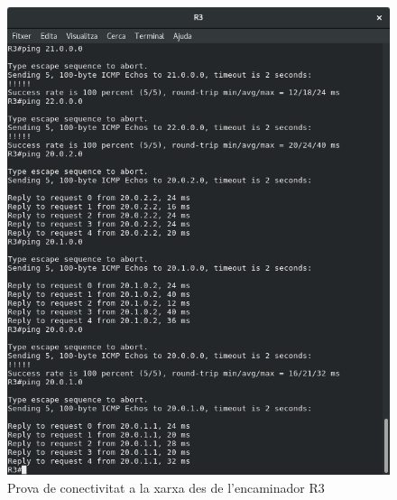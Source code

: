 \documentclass[10pt]{article}
\begin{document}
\begin{figure}[H]
\begin{center}
\includegraphics[scale=0.4]{Images/ospf-R3-conectivity.png}
\caption{Prova de conectivitat a la xarxa des de l'encaminador R3}
\end{center}
\end{figure}
\end{document}
